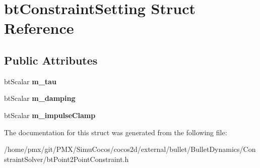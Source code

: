 \hypertarget{structbtConstraintSetting}{}\section{bt\+Constraint\+Setting Struct Reference}
\label{structbtConstraintSetting}
\subsection*{Public Attributes}
\begin{DoxyCompactItemize}
\item 
\mbox{\label{structbtConstraintSetting_a70d9a0ceb903796d1e5d2f6d564aa4df}} 
bt\+Scalar {\bfseries m\+\_\+tau}
\item 
\mbox{\label{structbtConstraintSetting_af9e203f9049922c0fd3cfcdcb52b5242}} 
bt\+Scalar {\bfseries m\+\_\+damping}
\item 
\mbox{\label{structbtConstraintSetting_a495ebbc03a1262535800c204fb5cf239}} 
bt\+Scalar {\bfseries m\+\_\+impulse\+Clamp}
\end{DoxyCompactItemize}


The documentation for this struct was generated from the following file\+:\begin{DoxyCompactItemize}
\item 
/home/pmx/git/\+P\+M\+X/\+Simu\+Cocos/cocos2d/external/bullet/\+Bullet\+Dynamics/\+Constraint\+Solver/bt\+Point2\+Point\+Constraint.\+h\end{DoxyCompactItemize}
